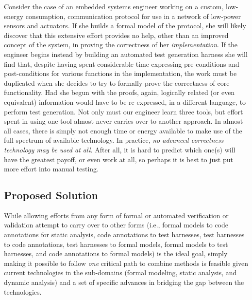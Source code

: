 Consider the case of an embedded systems engineer working on a custom, low-energy consumption, communication protocol for use in a network of low-power sensors and actuators.  If she builds a formal model of the protocol, she will likely discover that this extensive effort provides no help, other than an improved concept of the system, in proving the correctness of her \emph{implementation}.  If the engineer begins instead by building an automated test generation harness she will find that, despite having spent considerable time expressing pre-conditions and post-conditions for various functions in the implementation, the work must be duplicated when she decides to try to formally prove the correctness of core functionality.  Had she begun with the proofs, again, logically related (or even equivalent) information would have to be re-expressed, in a different language, to perform test generation.  Not only must our engineer learn three tools, but effort spent in using one tool almost never carries over to another approach.  In almost all cases, there is simply not enough time or energy available to make use of the full spectrum of available technology.  In practice, \emph{no advanced correctness technology may be used at all.}  After all, it is hard to predict which one(s) will have the greatest payoff, or even work at all, so perhaps it is best to just put more effort into manual testing.

\subsection{Proposed Solution}


While allowing efforts from any form of formal or automated verification or validation attempt to carry over to other forms (i.e., formal models to code annotations for static analysis, code annotations to test harnesses, test harnesses to code annotations, test harnesses to formal models, formal models to test harnesses, and code annotations to formal models) is the ideal goal, simply making it possible to follow \emph{one} critical path to combine methods is feasible given current technologies in the sub-domains (formal modeling, static analysis, and dynamic analysis) and a set of specific advances in bridging the gap between the technologies.

